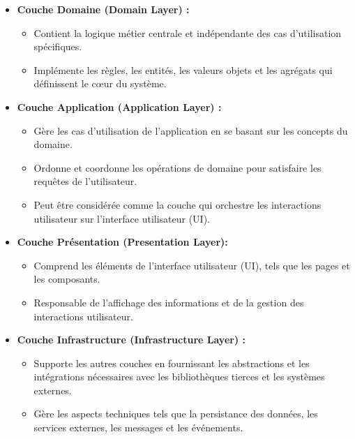 \begin{itemize}
    \item \textbf{Couche Domaine (Domain Layer) :}
          \begin{itemize}
              \item Contient la logique métier centrale et indépendante des cas d'utilisation spécifiques.
              \item Implémente les règles, les entités, les valeurs objets et les agrégats qui définissent le cœur du système.
          \end{itemize}




    \item \textbf{Couche Application (Application Layer) :}
          \begin{itemize}
              \item Gère les cas d'utilisation de l'application en se basant sur les concepts du domaine.
              \item Ordonne et coordonne les opérations de domaine pour satisfaire les requêtes de l'utilisateur.
              \item Peut être considérée comme la couche qui orchestre les interactions utilisateur sur l'interface utilisateur (UI).
          \end{itemize}







    \item \textbf{Couche Présentation (Presentation Layer):}
          \begin{itemize}
              \item Comprend les éléments de l'interface utilisateur (UI), tels que les pages et les composants.
              \item Responsable de l'affichage des informations et de la gestion des interactions utilisateur.
          \end{itemize}






    \item \textbf{Couche Infrastructure (Infrastructure Layer) :}
          \begin{itemize}
              \item Supporte les autres couches en fournissant les abstractions et les intégrations nécessaires avec les bibliothèques tierces et les systèmes externes.
              \item Gère les aspects techniques tels que la persistance des données, les services externes, les messages et les événements.
          \end{itemize}

\end{itemize}



